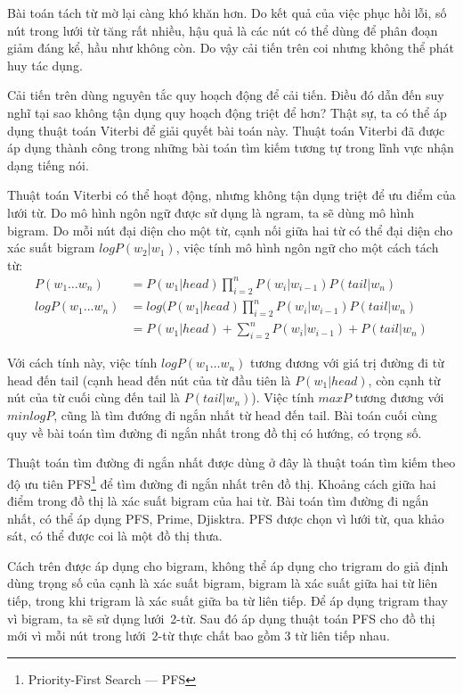 \documentclass[a4paper,oneside,14pt]{extbook} %
\begin{document}
Bài toán tách từ mờ lại càng khó khăn hơn. Do kết quả của việc phục
hồi lỗi, số nút trong lưới từ tăng rất nhiều, hậu quả là các nút có
thể dùng để phân đoạn giảm đáng kể, hầu như không còn. Do vậy cải tiến
trên coi nhưng không thể phát huy tác dụng.

Cải tiến trên dùng nguyên tắc quy hoạch động để cải tiến. Điều đó dẫn
đến suy nghĩ tại sao không tận dụng quy hoạch động triệt để hơn? Thật
sự, ta có thể áp dụng thuật toán Viterbi để giải quyết bài toán
này. Thuật toán Viterbi đã được áp dụng thành công trong những bài
toán tìm kiếm tương tự trong lĩnh vực nhận dạng tiếng nói.

Thuật toán Viterbi có thể hoạt động, nhưng không tận dụng triệt để ưu
điểm của lưới từ. Do mô hình ngôn ngữ được sử dụng là ngram, ta sẽ
dùng mô hình bigram. Do mỗi nút đại diện cho một từ, cạnh nối giữa hai
từ có thể đại diện cho xác suất bigram $logP(w_2|w_1)$, việc tính mô
hình ngôn ngữ cho một cách tách từ:
\begin{align*}
  P(w_1\ldots w_n)&= P(w_1|head)\prod_{i=2}^nP(w_i|w_{i-1})P(tail|w_n)\\
  logP(w_1\ldots w_n)&= log(P(w_1|head)\prod_{i=2}^nP(w_i|w_{i-1})P(tail|w_n)\\
  &=P(w_1|head)+\sum_{i=2}^nP(w_i|w_{i-1})+P(tail|w_n)
\end{align*}

Với cách tính này, việc tính $logP(w_1\ldots w_n)$ tương đương với giá
trị đường đi từ head đến tail (cạnh head đến nút của từ đầu tiên là
$P(w_1|head)$, còn cạnh từ nút của từ cuối cùng đến tail là
$P(tail|w_n)$). Việc tính $maxP$ tương đương với $minlogP$, cũng là
tìm đướng đi ngắn nhất từ head đến tail. Bài toán cuối cùng quy về bài
toán tìm đường đi ngắn nhất trong đồ thị có hướng, có trọng số.

Thuật toán tìm đường đi ngắn nhất được dùng ở đây là thuật toán tìm
kiếm theo độ ưu tiên PFS\footnote{Priority-First Search --- PFS} để tìm
đường đi ngắn nhất trên đồ thị. Khoảng cách giữa hai 
điểm trong đồ thị là xác suất bigram của hai từ. Bài toán tìm đường
đi ngắn nhất, có thể áp dụng PFS, Prime, Djisktra. PFS được chọn vì
lưới từ, qua khảo sát, có thể được coi là một đồ thị thưa.

Cách trên được áp dụng cho bigram, không thể áp dụng cho trigram do
giả định dùng trọng số của cạnh là xác suất bigram, bigram là xác suất
giữa hai từ liên tiếp, trong khi trigram là xác suất giữa ba từ liên
tiếp. Để áp dụng trigram thay vì bigram, ta sẽ sử dụng lưới~2-từ. Sau
đó áp dụng thuật toán PFS cho đồ thị mới vì mỗi nút trong lưới~2-từ
thực chất bao gồm 3 từ liên tiếp nhau.
\end{document}
